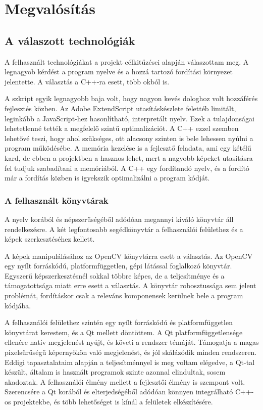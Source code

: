 \chapter{Megvalósítás}


\section{A válaszott technológiák}

A felhasznált technológiákat a projekt célkitűzései alapján válaszottam meg. A legnagyob kérdést a program nyelve és a hozzá tartozó fordítási környezet jelentette. A választás a C++-ra esett, több okból is. 

A szkript egyik legnagyobb baja volt, hogy nagyon kevés dologhoz volt hozzáférés fejlesztés közben. Az Adobe ExtendScript utasításkészlete felettéb limitált, leginkább a JavaScript-hez hasonlítható, interpretált nyelv. Ezek a tulajdonságai lehetetlenné tették a megfelelő szintű optimalizációt.
A C++ ezzel szemben lehetővé teszi, hogy ahol szükséges, ott alacsony szinten is bele lehessen nyúlni a program működésébe. A memória kezelése is a fejlesztő feladata, ami egy kétélű kard, de ebben a projektben a hasznos lehet, mert a nagyobb képeket utasításra fel tudjuk szabadítani a memóriából. 
A C++ egy fordítandó nyelv, és a fordító már a fordítás közben is igyekszik optimalizálni a program kódját.

\subsection{A felhasznált könyvtárak}

A nyelv korából és népszerűségéből adódóan megannyi kiváló könyvtár áll rendelkezésre. A két legfontosabb segédkönyvtár a felhasználói felülethez és a képek szerkesztéséhez kellett.

A képek manipulálásához az OpenCV könyvtárra esett a választás. Az OpenCV egy nyílt forráskódú, platformfüggetlen, gépi látással foglalkozó könyvtár. Egyszerű képszerkesztésnél sokkal többre képes, de a teljesítménye és a támogatottsága miatt erre esett a választás. A könyvtár robosztussága sem jelent problémát, fordításkor csak a releváns komponensek kerülnek bele a program kódjába.

A felhasználói felülethez szintén egy nyílt forráskódú és platformfüggetlen könyvtárat kerestem, és a Qt mellett döntöttem. A Qt platformfüggetlensége ellenére natív megjelenést nyújt, és követi a rendszer témáját. Támogatja a magas pixelsűrűségű képernyőkön való megjelenést, és jól skálázódik minden rendszeren. Eddigi tapasztalataim alapján a teljesítménnyel is meg voltam elégedve, a Qt-tal készült, általam is használt programok szinte azonnal elindultak, sosem akadoztak. A felhasználói élmény mellett a fejlesztői élmény is szempont volt. Szerencsére a Qt korából és elterjedségéből adódóan könnyen integrálható C++-os projektekbe, és több lehetőséget is kínál a felületek elkészítésére. 

